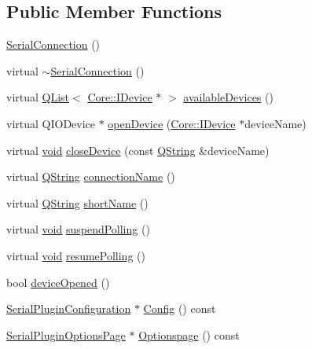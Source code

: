 \subsection*{Public Member Functions}
\begin{DoxyCompactItemize}
\item 
\hyperlink{group___serial_plugin_gaad6479d49b3483b42c19868c9efcef01}{Serial\-Connection} ()
\item 
virtual \hyperlink{group___serial_plugin_gae73749bb08c2f53f467809cb6c0a3fc8}{$\sim$\-Serial\-Connection} ()
\item 
virtual \hyperlink{class_q_list}{Q\-List}$<$ \hyperlink{class_core_1_1_i_device}{Core\-::\-I\-Device} $\ast$ $>$ \hyperlink{group___serial_plugin_ga35f8b088eb3166e3e81cc71809806085}{available\-Devices} ()
\item 
virtual Q\-I\-O\-Device $\ast$ \hyperlink{group___serial_plugin_gacbed38aeba722578f369ad9b4ef2b822}{open\-Device} (\hyperlink{class_core_1_1_i_device}{Core\-::\-I\-Device} $\ast$device\-Name)
\item 
virtual \hyperlink{group___u_a_v_objects_plugin_ga444cf2ff3f0ecbe028adce838d373f5c}{void} \hyperlink{group___serial_plugin_gaa5933c2426d549fd1621d1e29529e517}{close\-Device} (const \hyperlink{group___u_a_v_objects_plugin_gab9d252f49c333c94a72f97ce3105a32d}{Q\-String} \&device\-Name)
\item 
virtual \hyperlink{group___u_a_v_objects_plugin_gab9d252f49c333c94a72f97ce3105a32d}{Q\-String} \hyperlink{group___serial_plugin_ga4b91aa098a25069f0590a25687bdf25b}{connection\-Name} ()
\item 
virtual \hyperlink{group___u_a_v_objects_plugin_gab9d252f49c333c94a72f97ce3105a32d}{Q\-String} \hyperlink{group___serial_plugin_ga6783c4f6c9faa91aeb0b91fef726a2d4}{short\-Name} ()
\item 
virtual \hyperlink{group___u_a_v_objects_plugin_ga444cf2ff3f0ecbe028adce838d373f5c}{void} \hyperlink{group___serial_plugin_ga9616a4134ceba88c6ae5820e29a783c4}{suspend\-Polling} ()
\item 
virtual \hyperlink{group___u_a_v_objects_plugin_ga444cf2ff3f0ecbe028adce838d373f5c}{void} \hyperlink{group___serial_plugin_gac4a001507836025006728ab1771116f0}{resume\-Polling} ()
\item 
bool \hyperlink{group___serial_plugin_gaa9616a7f264a903a0a5b13ae05d40375}{device\-Opened} ()
\item 
\hyperlink{class_serial_plugin_configuration}{Serial\-Plugin\-Configuration} $\ast$ \hyperlink{group___serial_plugin_gad054f24566a90754595ad08e00756bfc}{Config} () const 
\item 
\hyperlink{class_serial_plugin_options_page}{Serial\-Plugin\-Options\-Page} $\ast$ \hyperlink{group___serial_plugin_gaf86b9d4296b2b9e6429dd643fd113861}{Optionspage} () const 
\end{DoxyCompactItemize}
